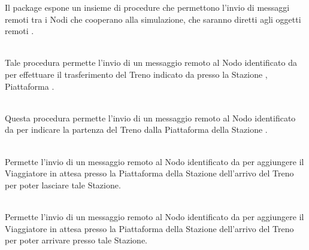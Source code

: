 	Il package  espone un insieme di procedure che permettono l'invio di messaggi remoti tra i Nodi che cooperano alla simulazione, che saranno diretti agli oggetti remoti .
	\begin{description}
		
		\item {}\\ 
		Tale procedura permette l'invio di un messaggio remoto al Nodo identificato da  per effettuare il trasferimento del Treno indicato da  presso la Stazione , Piattaforma . 
		
		\item {}\\ 
		Questa procedura permette l'invio di un messaggio remoto al Nodo identificato da  per indicare la partenza del Treno  dalla Piattaforma  della Stazione .
		
		\item {}\\
		Permette l'invio di un messaggio remoto al Nodo identificato da  per aggiungere il Viaggiatore  in attesa presso la Piattaforma  della Stazione  dell'arrivo del Treno  per poter lasciare tale Stazione.
		
		\item {}\\
		Permette l'invio di un messaggio remoto al Nodo identificato da  per aggiungere il Viaggiatore  in attesa presso la Piattaforma  della Stazione  dell'arrivo del Treno  per poter arrivare presso tale Stazione.
		
	\end{description}
	
